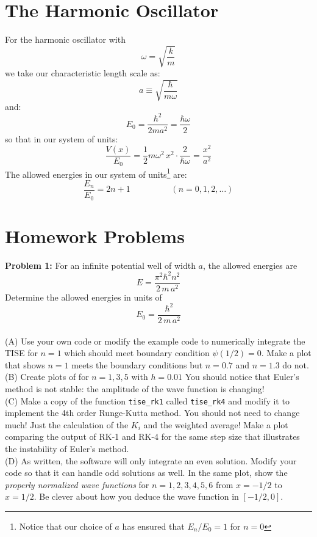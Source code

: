\documentclass[12pt]{article}
\begin{document}
\section{The Harmonic Oscillator}

For the harmonic oscillator with
\begin{equation*}
\omega = \sqrt{\frac{k}{m}}
\end{equation*}
we take our characteristic length scale as:
$$a \equiv \sqrt{\frac{\hbar}{m \omega}}$$
and:
$$E_0 = \frac{\hbar^2}{2ma^2} = \frac{\hbar \omega}{2}$$
so that in our system of units:
$$\frac{V(x)}{E_0} = \frac{1}{2}m\omega^2 \, x^2 \cdot \frac{2}{\hbar \omega} = \frac{x^2}{a^2}$$
The allowed energies in our system of units\footnote{Notice that our choice of $a$ has ensured that $E_n/E_0 = 1$ for $n=0$} are:
$$\frac{E_n}{E_0} = 2n+1  \hspace{2cm} (n=0,1,2,\ldots)$$

\section{Homework Problems}

\noindent
{\bf Problem 1:}  For an infinite potential well of width $a$, the allowed energies are
$$E = \frac{\pi^2 \hbar^2 n^2}{2 \, m \, a^2}$$  
Determine the allowed energies in units of 
$$E_0 = \frac{\hbar^2}{2 \, m \, a^2}$$\\[3pt]
\noindent
(A) Use your own code or modify the example code to numerically integrate the TISE for $n=1$ which should meet boundary condition $\psi(1/2)=0$.  Make a plot that shows $n=1$ meets the boundary conditions but $n=0.7$ and $n=1.3$ do not.\\[5pt]
(B) Create plots of for $n=1,3,5$ with $h=0.01$  You should notice that Euler's method 
is not stable:  the amplitude of the wave function is changing!\\[5pt]
(C) Make a copy of the function {\tt tise\_rk1} called {\tt tise\_rk4} and modify it to implement the 4th order Runge-Kutta method.  You should not need to change much!  Just the calculation of the $K_i$ and the weighted average!  Make a plot comparing the output of RK-1 and RK-4 for the same step size that illustrates the instability of Euler's method. \\[5pt]
(D) As written, the software will only integrate an even solution.  Modify your code so that it can handle odd solutions as well.  In the same plot, show the {\em properly normalized wave functions} for $n=1,2,3,4,5,6$ from $x=-1/2$ to $x=1/2$.  Be clever about how you deduce the wave function in $[-1/2,0]$.\\[5pt]
\end{document}
